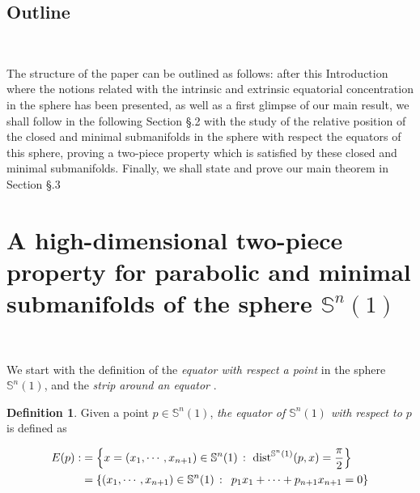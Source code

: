 \documentclass{amsart}
\theoremstyle{definition}
\newtheorem{definition}[theorem]{Definition}
\theoremstyle{remark}
\newcommand{\ese}{\mathbb{S}}
\begin{document}
\subsection{Outline}\

The structure of the paper can be outlined as follows: after this Introduction where the notions related with the intrinsic and extrinsic equatorial concentration in the sphere has been presented, as well as a first glimpse of our main result, we shall follow in the following Section \S.2 with the study of the relative position of the closed and minimal submanifolds in the sphere with respect the equators of this sphere, proving a two-piece property which is satisfied by these closed and minimal submanifolds. Finally, we shall state and prove our main theorem in Section \S.3





\section{A high-dimensional two-piece property for parabolic and minimal submanifolds of the sphere $\mathbb{S}^n(1)$ }\


We start with the definition of the {\em equator with respect a point} in the sphere $\ese^n(1)$, and the {\em strip around an equator }.

\begin{definition}
Given a point $p \in \mathbb{S}^n(1)$, \emph{the equator of $\mathbb{S}^n(1)$ with respect to $p$} is defined as 
   
  $$
    \begin{aligned}
E(p):&=\left\{x=(x_1,\cdots,x_{n+1})\in \mathbb{S}^n(1)\, :\,\,{\rm dist}^{\mathbb{S}^n(1)}(p,x)=\frac{\pi}{2} \right\}\\&=
\left\{(x_1,\cdots,x_{n+1})\in \mathbb{S}^n(1)\, : \,\,\, p_1x_1+\cdots+p_{n+1}x_{n+1}=0\right\}
\end{aligned}
    $$
    \end{definition}
    
\end{document}
